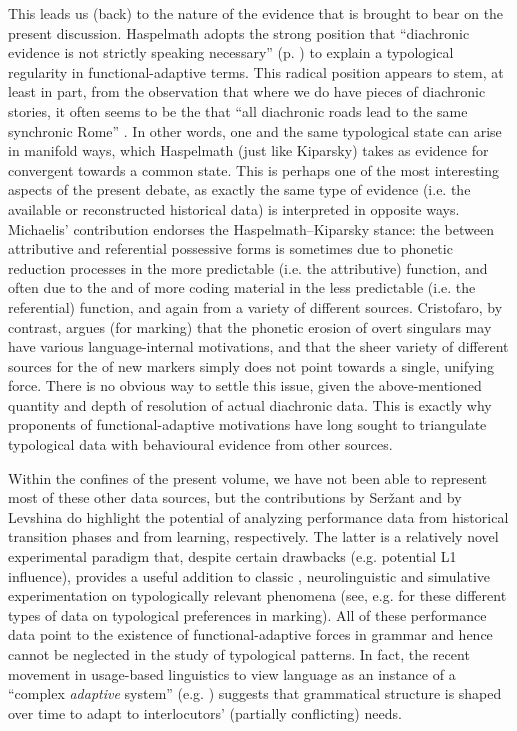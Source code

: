 \documentclass[output=paper]{langsci/langscibook}
\begin{document}
This leads us (back) to the nature of the evidence that is brought to bear on the present discussion. Haspelmath adopts the strong position that “diachronic evidence is not strictly speaking necessary” (p. \pageref{p:haspelmath:strictlyspeakingnecessary}) to explain a typological regularity in functional-adaptive terms. This radical position appears to stem, at least in part, from the observation that where we do have pieces of diachronic stories, it often seems to be the  that “all diachronic roads lead to the same synchronic Rome” \citep[38]{Kiparsky2008}. In other words, one and the same typological state can arise in manifold ways, which Haspelmath (just like Kiparsky) takes as evidence for convergent  towards a common  state. This is perhaps one of the most interesting aspects of the present debate, as exactly the same type of evidence (i.e. the available or reconstructed historical data) is interpreted in opposite ways. Michaelis’ contribution endorses the Haspelmath–Kiparsky stance: the  between attributive and referential possessive forms is sometimes due to phonetic reduction processes in the more predictable (i.e. the attributive) function, and often due to the  and  of more coding material in the less predictable (i.e. the referential) function, and again from a variety of different sources. Cristofaro, by contrast, argues (for  marking) that the phonetic erosion of overt singulars may have various language-internal motivations, and that the sheer variety of different sources for the  of new  markers simply does not point towards a single, unifying force. There is no obvious way to settle this issue, given the above-mentioned quantity and depth of resolution of actual diachronic data. This is exactly why proponents of functional-adaptive motivations have long sought to triangulate typological data with behavioural evidence from other sources.

Within the confines of the present volume, we have not been able to represent most of these other data sources, but the contributions by Seržant and by Levshina do highlight the potential of analyzing performance data from historical transition phases and from  learning, respectively. The latter is a relatively novel experimental paradigm that, despite certain drawbacks (e.g. potential L1 influence), provides a useful addition to classic , neurolinguistic and simulative experimentation on typologically relevant phenomena (see, e.g. \citealt{KurumadaJaeger2015,BickelEtAl2015,Lestrade2018} for these different types of data on typological preferences in  marking). All of these performance data point to the existence of functional-adaptive forces in grammar and hence cannot be neglected in the study of typological patterns. In fact, the recent movement in usage-based linguistics to view language as an instance of a “complex \textit{adaptive} system” (e.g. \citealt{Gell-Mann1992,BecknerEtAl2009}) suggests that grammatical structure is shaped over time to adapt to interlocutors’ (partially conflicting) needs. 
\end{document}
